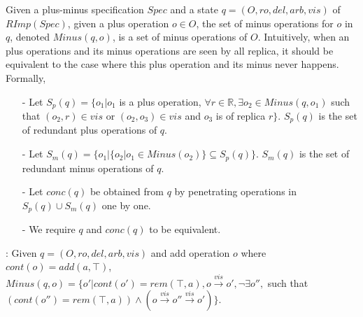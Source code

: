 Given a plus-minus specification $Spec$ and a state $q=(O,ro,del,arb,vis)$ of $RImp(Spec)$, given a plus operation $o \in O$, the set of minus operations for $o$ in $q$, denoted $Minus(q,o)$, is a set of minus operations of $O$. Intuitively, when an plus operations and its minus operations are seen by all replica, it should be equivalent to the case where this plus operation and its minus never happens. Formally,

\begin{itemize}
\setlength{\itemsep}{0.5pt}
\item[-] Let $S_p(q) = \{ o_1 \vert o_1$ is a plus operation, $\forall r \in \mathbb{R}, \exists o_2 \in Minus(q,o_1)$ such that $(o_2,r) \in vis$ or $(o_2,o_3) \in vis$ and $o_3$ is of replica $r\}$. $S_p(q)$ is the set of redundant plus operations of $q$.

\item[-] Let $S_m(q) = \{ o_1 \vert  \{ o_2 \vert o_1 \in Minus(o_2) \} \subseteq S_p(q) \}$. $S_m(q)$ is the set of redundant minus operations of $q$.

\item[-] Let $conc(q)$ be obtained from $q$ by penetrating operations in $S_p(q) \cup S_m(q)$ one by one.

\item[-] We require $q$ and $conc(q)$ to be equivalent.
\end{itemize}

: Given $q=(O,ro,del,arb,vis)$ and add operation $o$ where $cont(o)=add(a,\top)$, $Minus(q,o) = \{o' \vert cont(o')=rem(\top,a), o {\xrightarrow{vis}} o', \neg \exists o'',$ such that $( cont(o'') = rem(\top,a) ) \wedge ( o {\xrightarrow{vis}} o'' {\xrightarrow{vis}} o' ) \}$.


